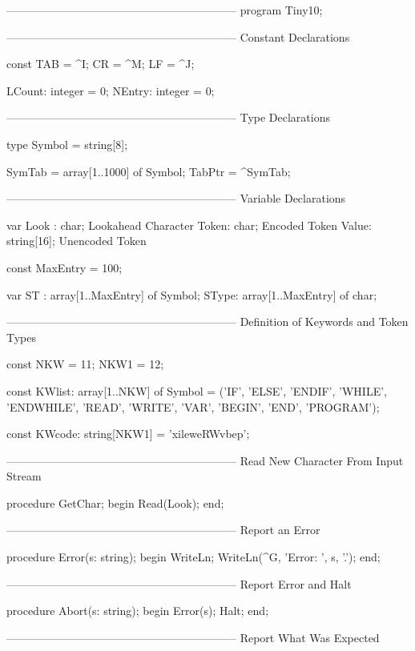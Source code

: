 \documentclass[float=false, crop=false]{standalone}
\begin{document}
\begin{code}
{--------------------------------------------------------------}
program Tiny10;

{--------------------------------------------------------------}
{ Constant Declarations }

const TAB = ^I;
      CR  = ^M;
      LF  = ^J;

      LCount: integer = 0;
      NEntry: integer = 0;


{--------------------------------------------------------------}
{ Type Declarations }

type Symbol = string[8];

     SymTab = array[1..1000] of Symbol;
     TabPtr = ^SymTab;


{--------------------------------------------------------------}
{ Variable Declarations }

var Look : char;             { Lookahead Character }
    Token: char;             { Encoded Token       }
    Value: string[16];       { Unencoded Token     }


const MaxEntry = 100;

var ST   : array[1..MaxEntry] of Symbol;
    SType: array[1..MaxEntry] of char;


{--------------------------------------------------------------}
{ Definition of Keywords and Token Types }

const NKW =   11;
      NKW1 = 12;

const KWlist: array[1..NKW] of Symbol =
              ('IF', 'ELSE', 'ENDIF', 'WHILE', 'ENDWHILE',
               'READ',    'WRITE',    'VAR',    'BEGIN',   'END',
'PROGRAM');

const KWcode: string[NKW1] = 'xileweRWvbep';


{--------------------------------------------------------------}
{ Read New Character From Input Stream }

procedure GetChar;
begin
   Read(Look);
end;

{--------------------------------------------------------------}
{ Report an Error }

procedure Error(s: string);
begin
   WriteLn;
   WriteLn(^G, 'Error: ', s, '.');
end;


{--------------------------------------------------------------}
{ Report Error and Halt }

procedure Abort(s: string);
begin
   Error(s);
   Halt;
end;


{--------------------------------------------------------------}
{ Report What Was Expected }


\end{code}
\end{document}
